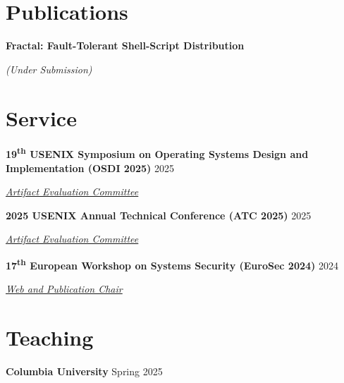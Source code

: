 \documentclass[margin,12pt]{resume}
\newcommand{\cvName}{Nikos Pagonas}
\newcommand{\subsectionVSpace}{\vspace{3.5ex}\xspace}
\newcommand{\sectionVSpace}{\vspace{1ex}\xspace} %
\newcommand{\sectionVSpaceCorrection}{\vspace{-3.5ex}} %
\newcommand{\header}[1]{\textbf{#1}\xspace}
\newcommand{\authors}[1]{#1\xspace}
\newcommand{\equalContributionNote}{(*equal contribution)\xspace}
\newcommand{\institution}[1]{\header{#1}\xspace}
\newcommand{\me}{\textbf{\cvName}\xspace}
\newcommand{\ordinal}[1]{\textsuperscript{#1}\xspace}
\newcommand{\paperTitle}[1]{\header{#1}\xspace}
\newcommand{\role}[1]{\textit{#1}\xspace}
\newcommand{\service}[1]{\header{#1}\xspace}
\newcommand{\singleDate}[1]{#1\xspace}
\newcommand{\underSubmission}{\textit{(Under Submission)}\xspace}
\newcommand{\venue}[1]{\textit{#1}\xspace}
\newenvironment{rSubsection}{}{\par\subsectionVSpace}
\newenvironment{rSection}[1]{\sectionVSpaceCorrection\section{#1}\xspace}{\sectionVSpace\par}
\begin{document}
\begin{resume}
\begin{rSection}{Publications}
\begin{rSubsection}

        \end{rSubsection}

        \begin{rSubsection}
            \paperTitle{Fractal: Fault-Tolerant Shell-Script Distribution}

            \underSubmission


        \end{rSubsection}
    \end{rSection}

    \begin{rSection}{Service}
        \begin{rSubsection}
            \service{19\ordinal{th} USENIX Symposium on Operating Systems Design and Implementation (OSDI 2025)} \hfill 2025

            \role{\href{https://www.usenix.org/conference/atc25}{Artifact Evaluation Committee}}
        \end{rSubsection}

        \begin{rSubsection}
            \service{2025 USENIX Annual Technical Conference (ATC 2025)} \hfill 2025

            \role{\href{https://www.usenix.org/conference/osdi25}{Artifact Evaluation Committee}}
        \end{rSubsection}

        \begin{rSubsection}
            \service{17\ordinal{th} European Workshop on Systems Security (EuroSec 2024)} \hfill 2024

            \role{\href{https://secopera.eu/eurosec-2024/}{Web and Publication Chair}}
        \end{rSubsection}
    \end{rSection}

    \begin{rSection}{Teaching}
        \begin{rSubsection}
            \institution{Columbia University} \hfill \singleDate{Spring 2025}


\end{rSubsection}
\end{rSection}
\end{resume}
\end{document}
